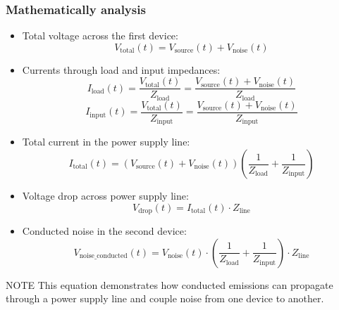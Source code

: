 \documentclass[10pt,hyperref={pdfpagemode=FullScreen},aspectratio=169]{beamer}
\begin{document}
\begin{frame}
  \frametitle{Mathematically analysis}

  \begin{itemize}
    \item Total voltage across the first device:
      \[
        V_\text{total}(t) = V_\text{source}(t) + V_\text{noise}(t)
      \]
    \item Currents through load and input impedances:
      \[
        I_\text{load}(t) = \frac{V_\text{total}(t)}{Z_\text{load}} = \frac{V_\text{source}(t) + V_\text{noise}(t)}{Z_\text{load}}
      \]
      \[
        I_\text{input}(t) = \frac{V_\text{total}(t)}{Z_\text{input}} = \frac{V_\text{source}(t) + V_\text{noise}(t)}{Z_\text{input}}
      \]
    \item Total current in the power supply line:
      \[
        I_\text{total}(t) = (V_\text{source}(t) + V_\text{noise}(t))\left(\frac{1}{Z_\text{load}} + \frac{1}{Z_\text{input}}\right)
      \]
    \item Voltage drop across power supply line:
      \[
        V_\text{drop}(t) = I_\text{total}(t) \cdot Z_\text{line}
      \]
    \end{itemize}

\end{frame}


\begin{frame}

  \begin{itemize}
    \item Conducted noise in the second device:
    \[
      V_\text{noise\_conducted}(t) = V_\text{noise}(t) \cdot \left(\frac{1}{Z_\text{load}} + \frac{1}{Z_\text{input}}\right) \cdot Z_\text{line}
    \]
  \end{itemize}

  \begin{block}{NOTE}
    This equation demonstrates how conducted emissions can propagate through a power supply line and couple noise from one device to another. 
  \end{block}

\end{frame}
\end{document}
